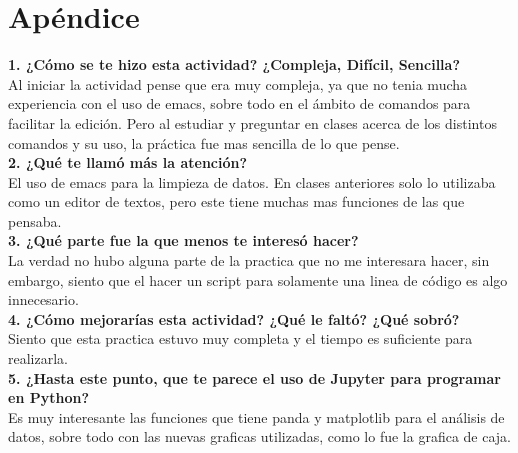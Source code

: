 \documentclass[12pt]{article}
\begin{document}
\section{Apéndice}
\noindent\textbf {1. ¿Cómo se te hizo esta actividad? ¿Compleja, Difícil, Sencilla?} \\
Al iniciar la actividad pense que era muy compleja, ya que no tenia mucha experiencia con el uso de emacs, sobre todo en el ámbito de comandos para facilitar la edición. Pero al estudiar y preguntar en clases acerca de los distintos comandos y su uso, la práctica fue mas sencilla de lo que pense. \\

\noindent\textbf {2. ¿Qué te llamó más la atención?}\\
El uso de emacs para la limpieza de datos. En clases anteriores solo lo utilizaba como un editor de textos, pero este tiene muchas mas funciones de las que pensaba. \\

\noindent\textbf {3. ¿Qué parte fue la que menos te interesó hacer? } \\
La verdad no hubo alguna parte de la practica que no me interesara hacer, sin embargo, siento que el hacer un script para solamente una linea de código es algo innecesario. \\

\noindent\textbf {4. ¿Cómo mejorarías esta actividad? ¿Qué le faltó? ¿Qué sobró?} \\
Siento que esta practica estuvo muy completa y el tiempo es suficiente para realizarla. \\

\noindent\textbf {5. ¿Hasta este punto, que te parece el uso de Jupyter para programar en Python?  }\\
Es muy interesante las funciones que tiene panda y matplotlib para el análisis de datos, sobre todo con las nuevas graficas utilizadas, como lo fue la grafica de caja. 
\end{document}
